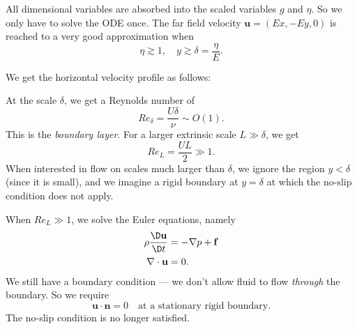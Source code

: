 \documentclass[a4paper]{article}
\begin{document}
\begin{eg}
  All dimensional variables are absorbed into the scaled variables $g$ and $\eta$. So we only have to solve the ODE once. The far field velocity $\mathbf{u} = (Ex, -E y, 0)$ is reached to a very good approximation when
  \[
    \eta \gtrsim 1,\quad y \gtrsim \delta = \frac{\eta}{E}.
  \]
  \begin{center}
  \end{center}
  We get the horizontal velocity profile as follows:
  \begin{center}
  \end{center}
  At the scale $\delta$, we get a Reynolds number of
  \[
    Re_\delta = \frac{U\delta}{\nu}\sim O(1).
  \]
  This is the \emph{boundary layer}. For a larger extrinsic scale $L \gg \delta$, we get
  \[
    Re_L = \frac{UL}{2} \gg 1.
  \]
  When interested in flow on scales much larger than $\delta$, we ignore the region $y < \delta$ (since it is small), and we imagine a rigid boundary at $y = \delta$ at which the no-slip condition does not apply.

  When $Re_L \gg 1$, we solve the Euler equations, namely
  \begin{align*}
    \rho \frac{\D \mathbf{u}}{\D t} &= - \nabla p + \mathbf{f}\\
    \nabla \cdot \mathbf{u} &= 0.
  \end{align*}
  We still have a boundary condition --- we don't allow fluid to flow \emph{through} the boundary. So we require
  \[
    \mathbf{u}\cdot \mathbf{n} = 0\quad\text{at a stationary rigid boundary}.
  \]
  The no-slip condition is no longer satisfied.


\end{eg}
\end{document}
